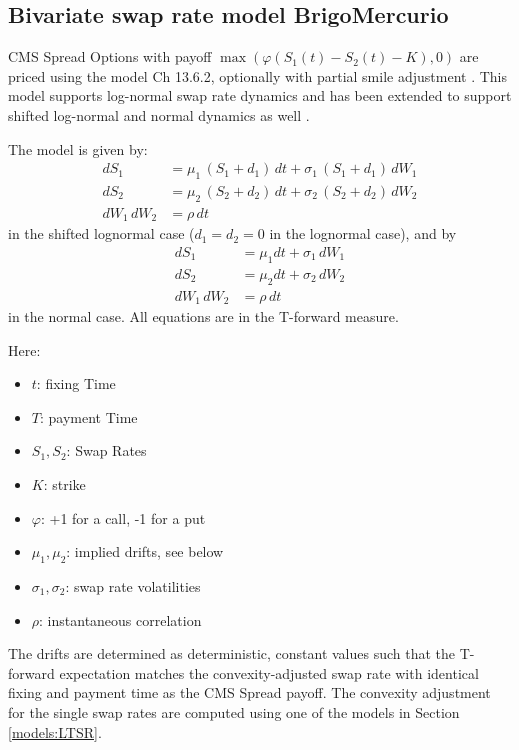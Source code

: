 \subsection{Bivariate swap rate model BrigoMercurio}
\label{models:BrigoMercurio}

CMS Spread Options with payoff $\max(\varphi(S_1(t)-S_2(t)-K),0)$ are priced using
the model \cite{Brigo_Mercurio_2006} Ch 13.6.2, optionally with partial smile
adjustment \cite{Berrahoui_2004}. This model supports log-normal swap rate dynamics
and has been extended to support shifted log-normal and normal dynamics as well
\cite{Caspers_2015}.

The model is given by:
\begin{align*}
dS_1 &= \mu_1 \,(S_1+d_1)\,dt+\sigma_1\, (S_1+d_1)\,dW_1 \\
dS_2 &= \mu_2 \,(S_2+d_2)\,dt+\sigma_2\, (S_2+d_2)\,dW_2 \\
dW_1 \,dW_2 & =\rho \,dt
\end{align*}
in the shifted lognormal case ($d_1=d_2=0$ in the lognormal case), and by
\begin{align*}
dS_1 &=\mu_1 dt + \sigma_1\, dW_1 \\
dS_2 &=\mu_2 dt +\sigma_2\, dW_2 \\
dW_1\,dW_2 &=\rho\,dt
\end{align*}
in the normal case. All equations are in the T-forward measure.

Here:
\begin{itemize}
\item $t$: fixing Time
\item $T$: payment Time
\item $S_1,S_2$: Swap Rates
\item $K$: strike
\item $\varphi$: +1 for a call, -1 for a put
\item $\mu_1,\mu_2$: implied drifts, see below
\item $\sigma_1,\sigma_2$: swap rate volatilities
\item $\rho$: instantaneous correlation
\end{itemize}
The drifts are determined as deterministic, constant values such that the
T-forward expectation matches the convexity-adjusted swap rate with identical
fixing and payment time as the CMS Spread payoff.  The convexity adjustment
for the single swap rates are computed using one of the models in Section
\ref{models:LTSR}.

